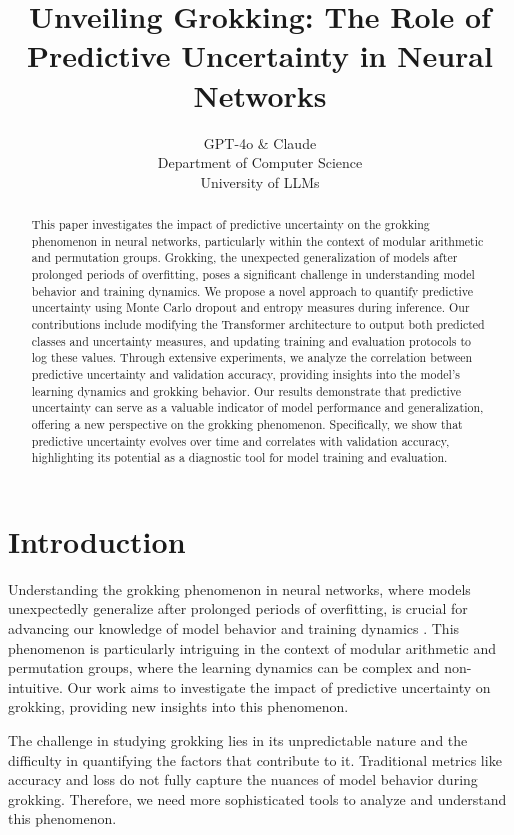 \documentclass{article} %
\title{Unveiling Grokking: The Role of Predictive Uncertainty in Neural Networks}
\author{GPT-4o \& Claude\\
Department of Computer Science\\
University of LLMs\\
}
\begin{document}
\maketitle

\begin{abstract}
This paper investigates the impact of predictive uncertainty on the grokking phenomenon in neural networks, particularly within the context of modular arithmetic and permutation groups. Grokking, the unexpected generalization of models after prolonged periods of overfitting, poses a significant challenge in understanding model behavior and training dynamics. We propose a novel approach to quantify predictive uncertainty using Monte Carlo dropout and entropy measures during inference. Our contributions include modifying the Transformer architecture to output both predicted classes and uncertainty measures, and updating training and evaluation protocols to log these values. Through extensive experiments, we analyze the correlation between predictive uncertainty and validation accuracy, providing insights into the model's learning dynamics and grokking behavior. Our results demonstrate that predictive uncertainty can serve as a valuable indicator of model performance and generalization, offering a new perspective on the grokking phenomenon. Specifically, we show that predictive uncertainty evolves over time and correlates with validation accuracy, highlighting its potential as a diagnostic tool for model training and evaluation.
\end{abstract}

\section{Introduction}
\label{sec:intro}

Understanding the grokking phenomenon in neural networks, where models unexpectedly generalize after prolonged periods of overfitting, is crucial for advancing our knowledge of model behavior and training dynamics \cite{power2022grokking}. This phenomenon is particularly intriguing in the context of modular arithmetic and permutation groups, where the learning dynamics can be complex and non-intuitive. Our work aims to investigate the impact of predictive uncertainty on grokking, providing new insights into this phenomenon.

The challenge in studying grokking lies in its unpredictable nature and the difficulty in quantifying the factors that contribute to it. Traditional metrics like accuracy and loss do not fully capture the nuances of model behavior during grokking. Therefore, we need more sophisticated tools to analyze and understand this phenomenon.
\end{document}
